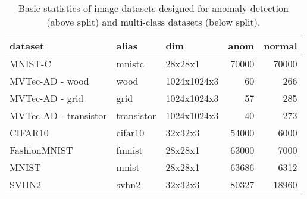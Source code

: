 \begin{table}
    \centering
    \tabcolsep=0.1cm
    \begin{tabular}{lllrr}
    \toprule
    \textbf{dataset} & \textbf{alias} & \textbf{dim} & \textbf{anom} & \textbf{normal} \\
    \midrule
    MNIST-C & mnistc & 28x28x1 & 70000 & 70000 \\
    MVTec-AD - wood & wood & 1024x1024x3 & 60 & 266 \\
    MVTec-AD - grid & grid & 1024x1024x3 & 57 & 285 \\
    MVTec-AD - transistor & transistor & 1024x1024x3 & 40 & 273 \\
    \midrule
    CIFAR10 & cifar10 & 32x32x3 & 54000 & 6000  \\
    FashionMNIST & fmnist & 28x28x1 & 63000 & 7000   \\
    MNIST & mnist & 28x28x1 & 63686 & 6312  \\
    SVHN2 & svhn2 & 32x32x3 & 80327 & 18960  \\\bottomrule
    \end{tabular}
    \vspace*{0.15cm}
    \caption{Basic statistics of image datasets designed for anomaly detection (above split) and multi-class datasets (below split).}
    \label{tab:image_datasets}
\end{table}


